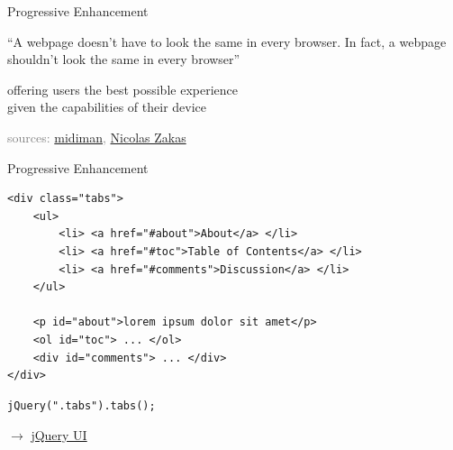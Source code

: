 \documentclass{beamer}
\begin{document}
\begin{frame}{Progressive Enhancement}

  \begin{exampleblock}{}
    {\large ``A webpage doesn't have to look the same in every browser. In fact, a webpage shouldn't look the same in every browser''}
    \vskip5mm
    \hspace*{}
  \end{exampleblock}

  \vspace*{0.5cm}
  offering users the best possible experience \\
  given the capabilities of their device
\end{frame}

{
  \begin{frame}
    \vspace*{6.7cm}
    \textcolor{gray}{\tiny
        sources:
        \href{http://www.flickr.com/photos/midiman/336647596}{midiman},
        \href{http://www.slideshare.net/nzakas/progressive-enhancement-20-conference-agnostic}{Nicolas Zakas}
    }
  \end{frame}
}

\begin{frame}[fragile]{Progressive Enhancement}

  \begin{verbatim}
<div class="tabs">
    <ul>
        <li> <a href="#about">About</a> </li>
        <li> <a href="#toc">Table of Contents</a> </li>
        <li> <a href="#comments">Discussion</a> </li>
    </ul>

    <p id="about">lorem ipsum dolor sit amet</p>
    <ol id="toc"> ... </ol>
    <div id="comments"> ... </div>
</div>
  \end{verbatim}
  \begin{verbatim}
jQuery(".tabs").tabs();
  \end{verbatim}

  \tiny \ensuremath{\rightarrow} \href{http://jqueryui.com/tabs/}{jQuery UI}
\end{frame}
\end{document}
